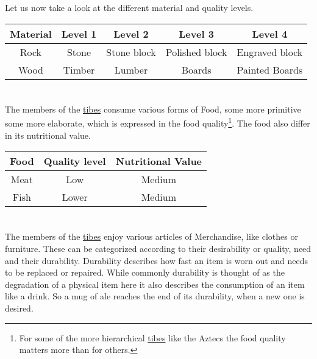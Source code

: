 Let us now take a look at the different material and quality levels.
\begin{longtable}{ccccc}
	\toprule
	Material & Level 1      & Level 2     & Level 3        & Level 4        \\
	\midrule
	Rock     & Stone        & Stone block & Polished block & Engraved block \\
	Wood     & \Gls{Timber} & Lumber      & Boards         & Painted Boards \\
	\bottomrule
\end{longtable}

\section{}\label{ch:Goods:Food}

The members of the \hyperref[ch:Tribes]{tibes} consume various forms of
\gls*{Food}, some more primitive some more elaborate, which is expressed in the
food quality\footnote{ For some of the more hierarchical
	\hyperref[ch:Tribes]{tibes} like the \gls{Aztecs} the food quality matters more
	than for others. }. The food also differ in its nutritional value.


\begin{longtable}{ccc}
	\toprule
	\Gls*{Food} & Quality level & Nutritional Value \\
	\midrule
	\Gls{Meat}  & Low           & Medium            \\
	\Gls{Fish}  & Lower         & Medium            \\
	\bottomrule
\end{longtable}

\section{}\label{ch:Goods:Merchandise}

The members of the \hyperref[ch:Tribes]{tibes} enjoy various articles of
\gls*{Merchandise}, like clothes or furniture. These can be categorized
according to their desirability or quality, need and their durability.
Durability describes how fast an item is worn out and needs to be replaced or
repaired. While commonly durability is thought of as the degradation of a
physical item here it also describes the consumption of an item like a drink.
So a mug of ale reaches the end of its durability, when a new one is desired.

